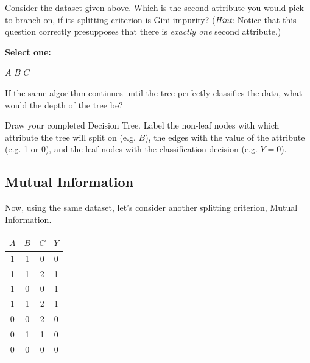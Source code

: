\begin{questions}
    
    
    \question[1] Consider the dataset given above. Which is the second attribute you would pick to branch on, if its splitting criterion is Gini impurity? (\emph{Hint:} Notice that this question correctly presupposes that there is \emph{exactly one} second attribute.)
    
    \textbf{Select one:}
    \begin{checkboxes}
        \choice $A$
        \choice $B$
        \choice $C$
    \end{checkboxes}
    
    
    \question[1] If the same algorithm continues until the tree perfectly classifies the data, what would the depth of the tree be?
    
    \begin{tcolorbox}[fit,height=1cm, width=2cm, blank, borderline={1pt}{-2pt},nobeforeafter]
    \end{tcolorbox}
    
    
\clearpage
    \question[4] Draw your completed Decision Tree. Label the non-leaf nodes with which attribute the tree will split on (e.g. $B$), the edges with the value of the attribute (e.g. 1 or 0), and the leaf nodes with the classification decision (e.g. $Y=0$).
    
    \begin{tcolorbox}[fit,height=20cm, width=15cm, blank, borderline={1pt}{-2pt},nobeforeafter]
    \end{tcolorbox}
    

\end{questions}

\subsection{Mutual Information}
\label{sec:mutual information}

Now, using the same dataset, let's consider another splitting criterion, Mutual Information.

\begin{center}
\begin{tabular}{|c|c|c|c|}
\hline
$A$ & $B$ & $C$ & $Y$ \\ \hline
1 & 1 & 0 & 0     \\ \hline
1 & 1 & 2 & 1     \\ \hline
1 & 0 & 0 & 1     \\ \hline
1 & 1 & 2 & 1     \\ \hline
0 & 0 & 2 & 0     \\ \hline
0 & 1 & 1 & 0     \\ \hline
0 & 0 & 0 & 0     \\ \hline
\end{tabular}
\end{center}


